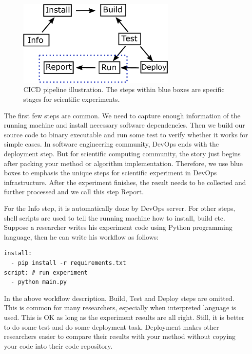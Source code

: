 \documentclass{IEEEcsmag}
\begin{document}
\begin{figure}[!ht]
\centerline{\includegraphics[width=18.5pc]{workflow.pdf}}
\caption{CICD pipeline illustration. The steps within blue boxes are specific stages for scientific experiments. }\label{fig:cicdworkflow}
\end{figure}

The first few steps are common. We need to capture enough information of the running machine and install necessary software dependencies. Then we build our source code to binary executable and run some test to verify whether it works for simple cases. In software engineering community, DevOps ends with the deployment step. But for scientific computing community, the story just begins after packing your method or algorithm implementation. Therefore, we use blue boxes to emphasis the unique steps for scientific experiment in DevOps infrastructure. After the experiment finishes, the result needs to be collected and further processed and we call this step Report.

For the Info step, it is automatically done by DevOps server. For other steps, shell scripts are used to tell the running machine how to install, build etc. Suppose a researcher writes his experiment code using Python programming language, then he can write his workflow as follows:
\begin{lstlisting}[caption={workflow description}, label={lst:wd}]
install: 
  - pip install -r requirements.txt
script: # run experiment
  - python main.py
\end{lstlisting}

In the above workflow description, Build, Test and Deploy steps are omitted. This is common for many researchers, especially when interpreted language is used. This is OK as long as the experiment results are all right. Still, it is better to do some test and do some deployment task. Deployment makes other researchers easier to compare their results with your method without copying your code into their code repository.
\end{document}

